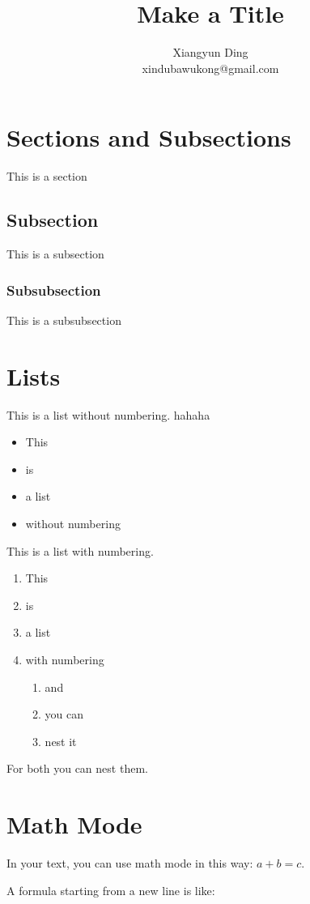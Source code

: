 \documentclass{article}[12pt]
\title{Make a Title}
\date{}
\author{Xiangyun Ding\\xindubawukong@gmail.com}
\begin{document}
\maketitle

\section{Sections and Subsections}
This is a section
\subsection{Subsection}
This is a subsection
\subsubsection{Subsubsection}
This is a subsubsection

\section{Lists}
This is a list without numbering.
hahaha
\begin{itemize}
  \item This
  \item is
  \item a list
  \item without numbering
\end{itemize}

This is a list with numbering.

\begin{enumerate}
  \item This
  \item is
  \item a list
  \item with numbering
  \begin{enumerate}
    \item and
    \item you can
    \item nest it
  \end{enumerate}
\end{enumerate}

For both you can nest them.

\section{Math Mode}
In your text, you can use math mode in this way: $a+b=c$.

A formula starting from a new line is like:
\end{document}
